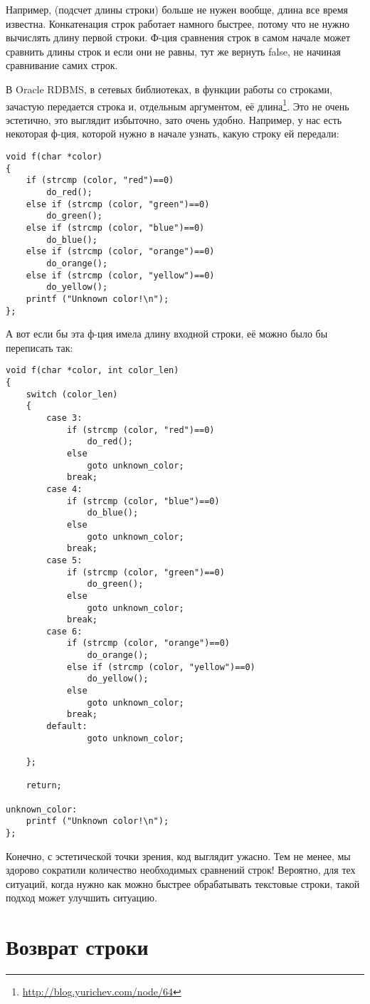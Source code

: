 Например,  (подсчет длины строки) больше не нужен вообще, длина все время известна.
Конкатенация строк работает намного быстрее, потому что не нужно вычислять длину первой строки.
Ф-ция сравнения строк в самом начале может сравнить длины строк и если они не равны, тут же вернуть false,
не начиная сравнивание самих строк.

В Oracle RDBMS, в сетевых библиотеках, в функции работы со строками, зачастую передается строка и, 
отдельным аргументом, её длина\footnote{\url{http://blog.yurichev.com/node/64}}.
Это не очень эстетично, это выглядит избыточно, зато очень удобно.
Например, у нас есть некоторая ф-ция, которой нужно в начале узнать, какую строку ей передали:

\begin{lstlisting}
void f(char *color)
{
	if (strcmp (color, "red")==0)
		do_red();
	else if (strcmp (color, "green")==0)
		do_green();
	else if (strcmp (color, "blue")==0)
		do_blue();
	else if (strcmp (color, "orange")==0)
		do_orange();
	else if (strcmp (color, "yellow")==0)
		do_yellow();
	printf ("Unknown color!\n");
};
\end{lstlisting}

А вот если бы эта ф-ция имела длину входной строки, её можно было бы переписать так:

\begin{lstlisting}
void f(char *color, int color_len)
{
	switch (color_len)
	{
		case 3:
			if (strcmp (color, "red")==0)
				do_red();
			else 
				goto unknown_color;
			break;
		case 4:
			if (strcmp (color, "blue")==0)
				do_blue();
			else
				goto unknown_color;
			break;
		case 5:
			if (strcmp (color, "green")==0)
				do_green();
			else
				goto unknown_color;
			break;
		case 6:
			if (strcmp (color, "orange")==0)
				do_orange();
			else if (strcmp (color, "yellow")==0)
				do_yellow();
			else
				goto unknown_color;
			break;
		default:
				goto unknown_color;

	};

	return;

unknown_color:
	printf ("Unknown color!\n");
};
\end{lstlisting}

Конечно, с эстетической точки зрения, код выглядит ужасно.
Тем не менее, мы здорово сократили количество необходимых сравнений строк! Вероятно, для тех ситуаций, когда 
нужно как можно быстрее обрабатывать текстовые строки, такой подход может улучшить ситуацию.

\section{Возврат строки}

